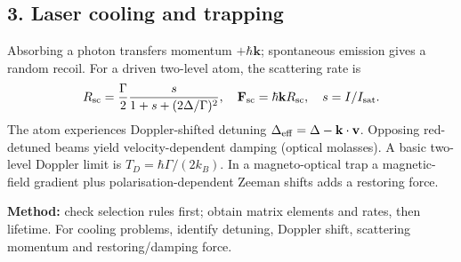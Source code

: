 \subsection*{3. Laser cooling and trapping}
Absorbing a photon transfers momentum \(+\hbar\mathbf k\);
spontaneous emission gives a random recoil.
For a driven two-level atom, the scattering rate is
\[
R_{\rm sc}=\frac{\Gamma}{2}
\frac{s}{1+s+(2\Delta/\Gamma)^2},\quad
\mathbf F_{\rm sc}=\hbar\mathbf k R_{\rm sc},\quad
s=I/I_{\rm sat}.
\]
The atom experiences Doppler-shifted detuning
\(\Delta_{\rm eff}=\Delta-\mathbf k\cdot\mathbf v\).
Opposing red-detuned beams yield velocity-dependent damping
(optical molasses). A basic two-level Doppler limit is
\(T_D=\hbar\Gamma/(2k_B)\). In a magneto-optical trap
a magnetic-field gradient plus polarisation-dependent
Zeeman shifts adds a restoring force.
\begin{methodbox}
\textbf{Method:} check selection rules first;
obtain matrix elements and rates, then lifetime.
For cooling problems, identify detuning, Doppler shift,
scattering momentum and restoring/damping force.
\end{methodbox}
